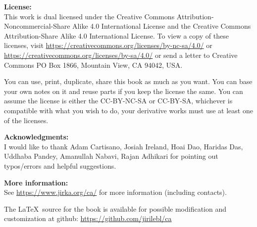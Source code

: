 \documentclass[12pt,openany]{book}
\theoremstyle{plain}
\theoremstyle{remark}
\theoremstyle{definition}
\theoremstyle{exercise}
\theoremstyle{example}
\begin{document}
\bigskip

\noindent
\textbf{License:}
\\
This work is dual licensed under
the Creative Commons
Attribution-Non\-commercial-Share Alike 4.0 International License and
the Creative Commons
Attribution-Share Alike 4.0 International License.
To view a
copy of these licenses, visit
\url{https://creativecommons.org/licenses/by-nc-sa/4.0/}
or
\url{https://creativecommons.org/licenses/by-sa/4.0/}
or send a letter to
Creative Commons
PO Box 1866, Mountain View, CA 94042, USA\@.

\bigskip

\noindent
You can use, print, duplicate, share this book as much as you want.  You can
base your own notes on it and reuse parts if you keep the license the
same.  You can assume the license is either the CC-BY-NC-SA or CC-BY-SA\@,
whichever is compatible with what you wish to do, your derivative works must
use at least one of the licenses.

\bigskip

\noindent
\textbf{Acknowledgments:}
\\
I would like to thank 
Adam Cartisano,
Josiah Ireland,
Hoai Dao,
Haridas Das,
Uddhaba Pandey,
Amanullah Nabavi,
Rajan Adhikari
for pointing out typos/errors
and helpful suggestions. 
%
%

\bigskip

\noindent
\textbf{More information:}
\\
See \url{https://www.jirka.org/ca/} for more information
(including contacts).

\medskip

\noindent
The \LaTeX\ source for the book is available
for possible modification and customization
at github: \url{https://github.com/jirilebl/ca}



\tableofcontents
{}


\end{document}

